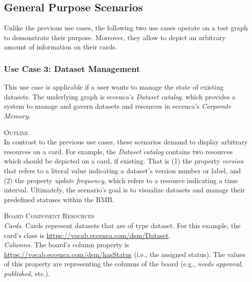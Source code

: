 \newpage

\subsection{General Purpose Scenarios}\label{ssec:UseCase3-DatasetMGMT}

Unlike the previous use cases, the following two use cases operate on a test graph to demonstrate their purpose. Moreover, they allow to depict an arbitrary amount of information on their cards. 


\subsubsection{Use Case 3: Dataset Management}

This use case is applicable if a user wants to manage the state of existing datasets. The underlying graph is eccenca’s \textit{ Dataset catalog}, which provides a system to manage and govern datasets and resources in eccenca’s \textit{Corporate Memory}.



\vspace*{\baselineskip}

\noindent \textsc{Outline}\\
\noindent In contrast to the previous use cases, these scenarios demand to display arbitrary resources on a card. For example, the \textit{ Dataset catalog} contains two resources which should be depicted on a card, if existing. That is (1) the property \textit{version} that refers to a literal value indicating a dataset’s version number or label, and (2) the property \textit{update frequency}, which refers to a resource indicating a time interval. Ultimately, the scenario’s goal is to visualize datasets and manage their predefined statuses within the \acrshort*{RMB}.  


\vspace*{\baselineskip}

\noindent \textsc{Board Component Resources}\\[-1.5em]

\noindent \hangindent=1.7cm \textit{Cards.}\tabto{1.7cm} Cards represent datasets that are of type dataset. For this example, the card’s class is \url{https://vocab.eccenca.com/dsm/Dataset}.\\[-1.5em]

\noindent \hangindent=1.7cm \textit{Columns.}\tabto{1.7cm} The board’s column property is \url{https://vocab.eccenca.com/dsm/hasStatus} (i.e., the assigned status). The values of this property are representing the columns of the board (e.g., \textit{needs approval}, \textit{published}, etc.).\\[-1.5em]

